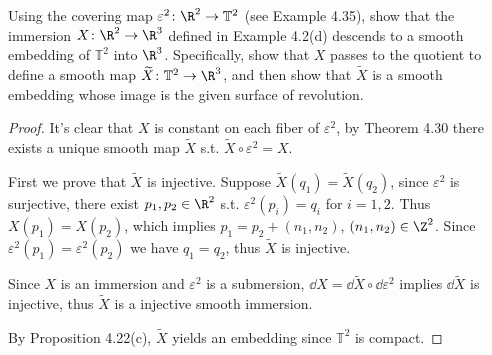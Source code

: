 \begin{problem}
    Using the covering map $\varepsilon^2 \colon \R^2 \to \mathbb{T}^2$ (see Example 4.35), show that 
    the immersion $X \colon \R^2 \to \R^3$ defined in Example 4.2(d) descends to a smooth embedding of $\mathbb{T}^2$ into $\R^3$. 
    Specifically, show that $X$ passes to the quotient to define a smooth map $ \widetilde{X} \colon \mathbb{T}^2 \to \R^3$, 
    and then show that $\widetilde{X}$ is a smooth embedding whose image is the given surface of revolution.
    \begin{proof}
        It's clear that $X$ is constant on each fiber of $\varepsilon^2$, by Theorem 4.30 there exists a unique smooth map $\widetilde{X}$ s.t. $\widetilde{X} \circ \varepsilon^2 = X$.

        First we prove that $\widetilde{X}$ is injective. Suppose $\widetilde{X}(q_1) = \widetilde{X}(q_2)$, since $\varepsilon^2$ is surjective, there exist $p_1, p_2 \in \R^2$ s.t. $\varepsilon^2(p_i) = q_i$ for $i=1,2$.
        Thus $X(p_1) = X(p_2)$, which implies $p_1 = p_2 + (n_1, n_2)$, $(n_1, n_2) \in \Z^2$. Since $\varepsilon^2(p_1) = \varepsilon^2(p_2)$ we have $q_1 = q_2$, thus $\widetilde{X}$ is injective.

        Since $X$ is an immersion and $ \varepsilon^2$ is a submersion, $\dd{X} = \dd{\widetilde{X}} \circ \dd{\varepsilon^2}$ implies $\dd{\widetilde{X}}$ is injective, thus $\widetilde{X}$ is a injective smooth immersion.

        By Proposition 4.22(c), ${\widetilde{X}}$ yields an embedding since $\mathbb{T}^2$ is compact.
    \end{proof}
\end{problem}


